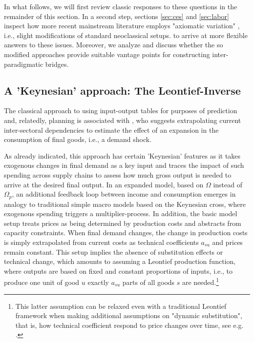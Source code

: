 \documentclass{article}
\begin{document}
In what follows, we will first review classic responses to these questions in the remainder of this section. In a second step, sections \ref{sec:ces} and \ref{sec:labor}  inspect how more recent mainstream literature employs "axiomatic variation" \citep{Kapeller.2013}, i.e., slight modifications of standard neoclassical setups. to arrive at more flexible answers to these issues. Moreover, we analyze and discuss whether the so modified approaches provide suitable vantage points for constructing inter-paradigmatic bridges.

\subsection{A 'Keynesian' approach: The Leontief-Inverse}\label{subsec:Leontief}
\label{sec:leontief}
The classical approach to using input-output tables for purposes of prediction and, relatedly, planning is associated with \citetext{\citealp{Leontief.1936}, see also \citealt{leontief1986input}}, who suggests extrapolating current inter-sectoral dependencies to estimate the effect of an expansion in the consumption of final goods, i.e., a demand shock. 

As already indicated, this approach has certain 'Keynesian' features as it takes exogenous changes in final demand as a key input and traces the impact of such spending across supply chains to assess how much gross output is needed to arrive at the desired final output. In an expanded model, based on $\Omega$ instead of $\Omega_p$, an additional feedback loop between income and consumption emerges in analogy to traditional simple macro models based on the Keynesian cross, where exogenous spending triggers a multiplier-process. In addition, the basic model setup treats prices as being determined by production costs and abstracts from capacity constraints. When final demand changes, the change in production costs is simply extrapolated from current costs as technical coefficients $a_{su}$ and prices remain constant. This setup implies the absence of substitution effects or technical change, which amounts to assuming a Leontief production function, where outputs are based on fixed and constant proportions of inputs, i.e., to produce one unit of good $u$ exactly $a_{su} $ parts of all goods $s$ are needed.\footnote{This latter assumption can be relaxed even with a traditional Leontief framework when making additional assumptions on "dynamic substitution", that is, how technical coefficient respond to price changes over time, see e.g. \citet{Labini.1995}.}
\end{document}
